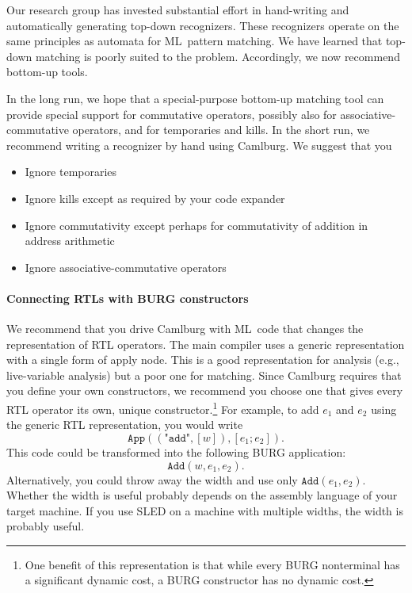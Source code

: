 \documentclass[12pt]{article}
\begin{document}
Our research group has invested substantial effort in hand-writing and
automatically generating top-down recognizers.
These recognizers operate on the same principles as automata for
ML~pattern matching.
We have learned that top-down matching is poorly suited to the
problem.
Accordingly, we now recommend bottom-up tools.

\label{sec:camlburg-rec}

In the long run, we hope that a special-purpose bottom-up matching
tool can provide special support for commutative operators, possibly
also for
associative-commutative operators, and for
temporaries and kills.
In the short run, we recommend writing a recognizer by hand using
Camlburg.
We suggest that you
\begin{itemize}
\item
Ignore temporaries
\item
Ignore kills except as required by your code expander
\item
Ignore commutativity except perhaps for commutativity of addition in
address arithmetic
\item
Ignore associative-commutative operators
\end{itemize}

\paragraph{Connecting RTLs with BURG constructors}

We recommend that you drive Camlburg with ML~code that changes
the representation of RTL operators.
The main compiler uses a generic representation with a single form of
apply node.
This is a good representation for analysis (e.g., live-variable
analysis) but a poor one for matching.
Since Camlburg requires that you define your own constructors, we
recommend you choose one that gives every RTL operator its own, unique
constructor.\footnote
{One benefit of this representation is that while every BURG
nonterminal has a significant dynamic cost, a BURG constructor has no
dynamic cost.}
For example, to add $e_1$ and $e_2$ using the generic RTL
representation, you would write
$$\texttt{App}((\texttt{"add"}, [w]), [e_1; e_2]).$$
This code could be transformed into the following BURG application:
$$\texttt{Add}(w, e_1, e_2).$$
Alternatively, you could throw away the width and use only 
$\texttt{Add}(e_1, e_2)$.
Whether the width is useful probably depends on the assembly language
of your target machine.
If you use SLED on a machine with multiple widths, the width is
probably useful.
\end{document}
